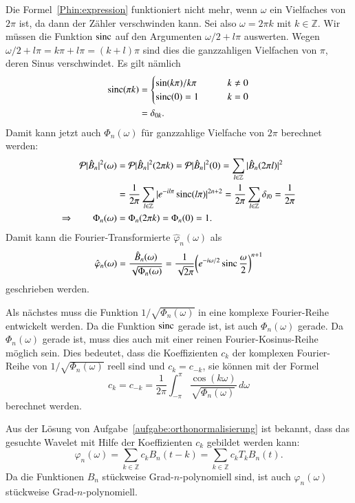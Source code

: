 Die Formel~\eqref{Phin:expression} funktioniert nicht mehr, wenn $\omega$
ein Vielfaches von $2\pi$ ist, da dann der Zähler verschwinden kann.
Sei also $\omega = 2\pi k$ mit $k\in\mathbb Z$.
Wir müssen die Funktion $\sinc$ auf den Argumenten
$\omega/2+l\pi$ auswerten.
Wegen $\omega/2 + l\pi=k\pi + l\pi = (k+l)\pi$ sind dies die ganzzahligen
Vielfachen von $\pi$, deren Sinus verschwindet.
Es gilt nämlich
\begin{align*}
\sinc (\pi k)
&=
\begin{cases}
\sin(k\pi)/k\pi&\qquad k\ne 0\\
\sinc(0)=1&\qquad k=0
\end{cases}
\\
&=
\delta_{0k}.
\end{align*}
Damit kann jetzt auch $\Phi_n(\omega)$ für ganzzahlige Vielfache von $2\pi$ 
berechnet werden:
\begin{align*}
\mathcal{P}|\hat{B}_n|^2(\omega)
&=
\mathcal{P}|\hat{B}_n|^2(2\pi k)
=
\mathcal{P}|\hat{B}_n|^2(0)
=
\sum_{l\in\mathbb Z} |\hat{B}_n(2\pi l)|^2
\\
&=
\frac1{2\pi}
\sum_{l\in\mathbb Z} |e^{-il\pi}\sinc(l\pi)|^{2n+2}
=
\frac1{2\pi}
\sum_{l\in\mathbb Z} \delta_{l0}
=
\frac1{2\pi}
\\
\Rightarrow\qquad
\Phi_n(\omega)
&=
\Phi_n(2\pi k)
=
\Phi_n(0)=1.
\end{align*}
Damit kann die Fourier-Transformierte $\hat{\varphi}_n(\omega)$ als
\[
\hat{\varphi}_n(\omega)
=
\frac{\hat{B}_n(\omega)}{\sqrt{\Phi_n(\omega)}}
=
\frac{1}{\sqrt{2\pi}}
\biggl(e^{-i\omega/2}\sinc\frac{\omega}2\biggr)^{n+1}
\]
geschrieben werden.

Als nächstes muss die Funktion $1/\sqrt{\Phi_n(\omega)}$ in eine komplexe
Fourier-Reihe entwickelt werden.
Da die Funktion $\sinc$ gerade ist, ist auch $\Phi_n(\omega)$ gerade.
Da $\Phi_n(\omega)$ gerade ist, muss dies auch mit einer reinen
Fourier-Kosinus-Reihe möglich sein.
Dies bedeutet, dass die Koeffizienten $c_k$ der komplexen Fourier-Reihe
von $1/\sqrt{\Phi_n(\omega)}$ reell sind und $c_k=c_{-k}$,
sie können mit 
der Formel
\begin{equation}
c_k = c_{-k}
=
\frac{1}{2\pi}
\int_{-\pi}^{\pi}
\frac{\cos(k\omega)}{\sqrt{\Phi_n(\omega)}}
\,d\omega
\label{sqrtPhincoef}
\end{equation}
berechnet werden.

Aus der Lösung von Aufgabe~\ref{aufgabe:orthonormalisierung} ist bekannt,
dass das gesuchte Wavelet mit Hilfe der Koeffizienten $c_k$ gebildet werden 
kann:
\[
\varphi_n(\omega)
=
\sum_{k\in\mathbb Z}
c_k B_n(t-k)
=
\sum_{k\in\mathbb Z}
c_k T_kB_n(t).
\]
Da die Funktionen $B_n$ stückweise Grad-$n$-polynomiell sind, ist auch
$\varphi_n(\omega)$ stückweise Grad-$n$-po\-ly\-no\-miell.

